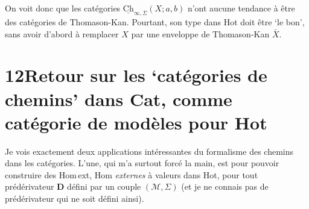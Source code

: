 \documentclass[11pt]{article}
\newcommand{\printedpage}[1]{\marginpar{\footnotesize p.~#1}}
\newcommand{\msp}[1]{\marginpar{\footnotesize [#1]}}
\newcommand{\uCh}{\underline{\mathrm{Ch}}}
\begin{document}
On voit donc que les catégories $\uCh_{\infty,\Sigma}(X;a,b)$ n'ont aucune tendance à être des catégories de Thomason-Kan. Pourtant, son type dans Hot doit être `le bon', sans avoir d'abord à remplacer $X$ par une enveloppe de Thomason-Kan $\bar{X}$.

\printedpage{85}

\msp{page 137}

\section*{12\quad Retour sur les `catégories de chemins' dans \textmd{Cat}, comme catégorie de modèles pour \textmd{Hot}}

Je vois exactement deux applications intéressantes du formalisme des chemins dans les catégories. L'une, qui m'a surtout forcé la main, est pour pouvoir construire des Hom\,ext, Hom \textit{externes} à valeurs dans Hot, pour tout prédérivateur $\mathbf{D}$ défini par un couple $(\mathcal{M},\Sigma)$ (et je ne connais pas de prédérivateur qui ne soit défini ainsi).
\end{document}
